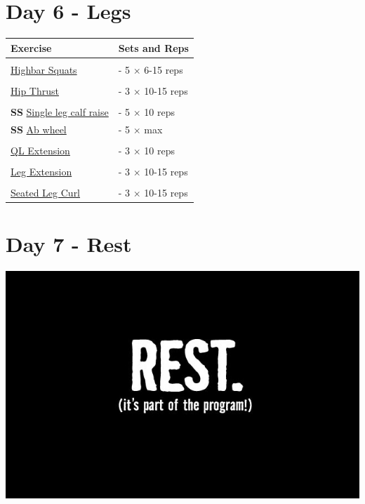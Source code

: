 \documentclass[11pt]{article}
\begin{document}
\section*{Day 6 - Legs}
\begin{center}
\begin{tabular}{|l|l|}
\hline
\textbf{Exercise} & \textbf{Sets and Reps}\\
\hline
&\\
\href{https://www.youtube.com/watch?v=zoZWgTrZLd8}{ Highbar Squats} & - 5 $\times$ 6-15 reps \\
\hline
&\\
\href {https://www.youtube.com/watch?v=Zp26q4BY5HE}{Hip Thrust } & - 3 $\times$  10-15 reps \\
\hline
&\\
\textbf{SS} \href{https://www.youtube.com/watch?v=DlcI-MK6jAA}{Single leg calf raise} & - 5 $\times$ 10 reps \\
\textbf{SS} \href{https://www.youtube.com/shorts/7GNGzZiyDhE}{Ab wheel} &-  5 $\times$ max \\
\hline
&\\
\href{https://www.youtube.com/shorts/MVu18rxmukk}{QL Extension} & - 3 $\times$ 10 reps \\
\hline
&\\
\href{https://www.youtube.com/watch?v=swZQC689o9U}{Leg Extension} & - 3 $\times$ 10-15 reps \\
\hline
&\\
\href{https://www.youtube.com/watch?v=oFxEDkppbSQ}{Seated Leg Curl} & - 3 $\times$ 10-15 reps \\
\hline
\end{tabular}
\end{center}

\section*{Day 7 - Rest}
\includegraphics[width=\textwidth]{rest.jpg}
\end{document}
